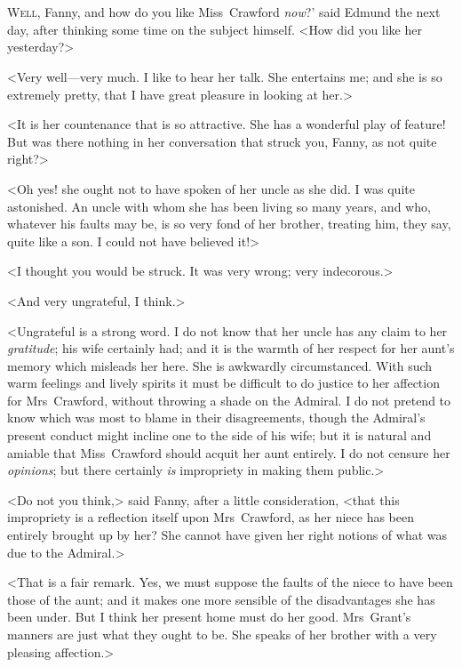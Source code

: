 \chapter[Chapter \thechapter]{}
	
\lettrine[ante=`,lraise=0.3]{W}{ell,} Fanny, and how do you like Miss~Crawford \textit{now}?' said Edmund the next day, after thinking some time on the subject himself. <How did you like her yesterday?>

\zz
<Very well—very much. I like to hear her talk. She entertains me; and she is so extremely pretty, that I have great pleasure in looking at her.>

<It is her countenance that is so attractive. She has a wonderful play of feature! But was there nothing in her conversation that struck you, Fanny, as not quite right?>

<Oh yes! she ought not to have spoken of her uncle as she did. I was quite astonished. An uncle with whom she has been living so many years, and who, whatever his faults may be, is so very fond of her brother, treating him, they say, quite like a son. I could not have believed it!>

<I thought you would be struck. It was very wrong; very indecorous.>

<And very ungrateful, I think.>

<Ungrateful is a strong word. I do not know that her uncle has any claim to her \textit{gratitude}; his wife certainly had; and it is the warmth of her respect for her aunt's memory which misleads her here. She is awkwardly circumstanced. With such warm feelings and lively spirits it must be difficult to do justice to her affection for Mrs~Crawford, without throwing a shade on the Admiral. I do not pretend to know which was most to blame in their disagreements, though the Admiral's present conduct might incline one to the side of his wife; but it is natural and amiable that Miss~Crawford should acquit her aunt entirely. I do not censure her \textit{opinions}; but there certainly \textit{is}  impropriety in making them public.>

<Do not you think,> said Fanny, after a little consideration, <that this impropriety is a reflection itself upon Mrs~Crawford, as her niece has been entirely brought up by her? She cannot have given her right notions of what was due to the Admiral.>

<That is a fair remark. Yes, we must suppose the faults of the niece to have been those of the aunt; and it makes one more sensible of the disadvantages she has been under. But I think her present home must do her good. Mrs~Grant's manners are just what they ought to be. She speaks of her brother with a very pleasing affection.>

